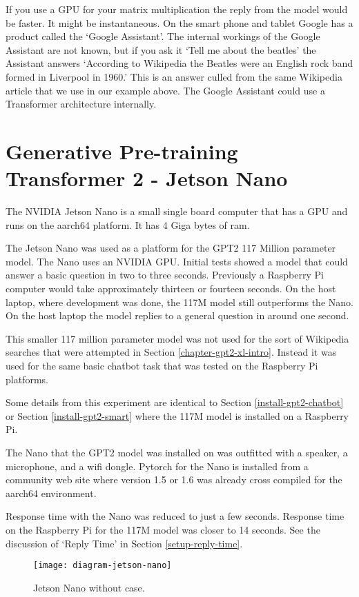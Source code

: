 If you use a GPU for your matrix multiplication the reply from the model would be faster. It might be instantaneous. On the smart phone and tablet Google has a product called the `Google Assistant'. The internal workings of the Google Assistant are not known, but if you ask it `Tell me about the beatles' the Assistant answers `According to Wikipedia the Beatles were an English rock band formed in Liverpool in 1960.' This is an answer culled from the same Wikipedia article that we use in our example above. The Google Assistant could use a Transformer architecture internally.

\label{chapter-xlarge}

\section{Generative Pre-training Transformer 2 - Jetson Nano}

\label{chapter-nano}
The NVIDIA Jetson Nano is a small single board computer that has a GPU and runs on the aarch64 platform. It has 4 Giga bytes of ram.

The Jetson Nano was used as a platform for the GPT2 117 Million parameter model. The Nano uses an NVIDIA GPU. Initial tests showed a model that could answer a basic question in two to three seconds. Previously a Raspberry Pi computer would take approximately thirteen or fourteen seconds. On the host laptop, where development was done, the 117M model still outperforms the Nano. On the host laptop the model replies to a general question in around one second.

This smaller 117 million parameter model was not used for the sort of Wikipedia searches that were attempted in Section \ref{chapter-gpt2-xl-intro}. Instead it was used for the same basic chatbot task that was tested on the Raspberry Pi platforms.

Some details from this experiment are identical to Section \ref{install-gpt2-chatbot} or Section \ref{install-gpt2-smart} where the 117M model is installed on a Raspberry Pi.

The Nano that the GPT2 model was installed on was outfitted with a speaker, a microphone, and a wifi dongle. Pytorch for the Nano is installed from a community web site where version 1.5 or 1.6 was already cross compiled for the aarch64 environment. 

Response time with the Nano was reduced to just a few seconds. Response time on the Raspberry Pi for the 117M model was closer to 14 seconds. See the discussion of `Reply Time' in Section \ref{setup-reply-time}.

\begin{figure}[H]
	\begin{center}
		\texttt{[image: diagram-jetson-nano]}
		
		
	\end{center}
	\caption[Jetson Nano]{Jetson Nano without case.}
	
	
\end{figure}